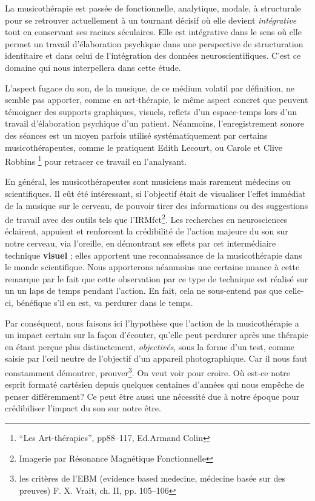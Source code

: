  La musicothérapie est passée de fonctionnelle, analytique, mo\-da\-le,  à 
struc\-tu\-rale pour se retrouver actuellement 
 à un tournant décisif où elle devient 
 \emph{intégrative} tout en conservant ses racines séculaires. Elle est 
intégrative dans le sens où elle permet un travail d'élaboration psychique dans 
une perspective de structuration identitaire \autocite[ch. III, p. 53, 
105]{vrait_musicotherapie_2018} et dans celui de l'intégration des données 
neuroscientifiques.
C'est ce domaine qui nous interpellera dans cette étude.


 
  
L'aspect fugace du son, de la musique, de ce médium volatil par
définition, ne semble pas apporter, comme en art-thérapie, le
même aspect concret que peuvent témoigner des supports graphiques,
visuels, reflets d'un espace-temps lors d'un travail d'élaboration
psychique d'un patient. Néanmoins, l'enregistrement sonore des séances
est un moyen parfois utilisé systématiquement par certains musicothérapeutes, comme le pratiquent Edith Lecourt, ou Carole et Clive 
Robbins \footnote{``Les Art-thérapies'', pp88--117, Ed.Armand Colin}
pour retracer ce travail en l'analysant.


En général, les musicothérapeutes sont musiciens mais rarement
médecins ou scientifiques. Il eût été intéressant, si l'objectif
 était 
 de visualiser l'effet immédiat de la musique sur le cerveau, de
 pouvoir tirer des informations ou des suggestions de travail  avec
 des outils tels que l'IRMfct\footnote{Imagerie par Résonance Magnétique
   Fonctionnelle}.
Les recherches en neurosciences éclairent, appuient et renforcent la crédibilité de l'action
majeure du son sur notre cerveau, via l'oreille, en démontrant ses effets par cet intermédiaire technique \textbf{visuel} ; elles apportent une 
reconnaissance de la musicothérapie dans le monde scientifique. Nous apporterons néanmoins une certaine nuance à cette remarque par le fait que cette observation par ce type de technique est réalisé sur un un laps de temps pendant l'action. En fait, cela ne sous-entend pas que celle-ci, bénéfique s'il en est, va perdurer dans le temps. 

Par conséquent, nous  faisons ici l'hypothèse que l'action de la 
musicothérapie a un impact certain sur la façon d'écouter, qu'elle peut perdurer après une thérapie en étant 
perçue plus
distinctement, \textsl{objectivés}, sous la forme d'un test, comme saisie par 
l'\oe il neutre de l'objectif d'un appareil
photographique.
Car il nous faut constamment démontrer, prouver\footnote{
	les critères de l'EBM (evidence based medecine, médecine basée sur des 
preuves) F. X. Vrait, ch. II, pp. 105--106 }. On veut voir pour croire. Où est-ce 
notre esprit formaté cartésien depuis quelques centaines d'années qui nous 
empêche de penser différemment? 
Ce peut être aussi une nécessité due à notre époque pour crédibiliser l'impact 
du son sur notre être. 



